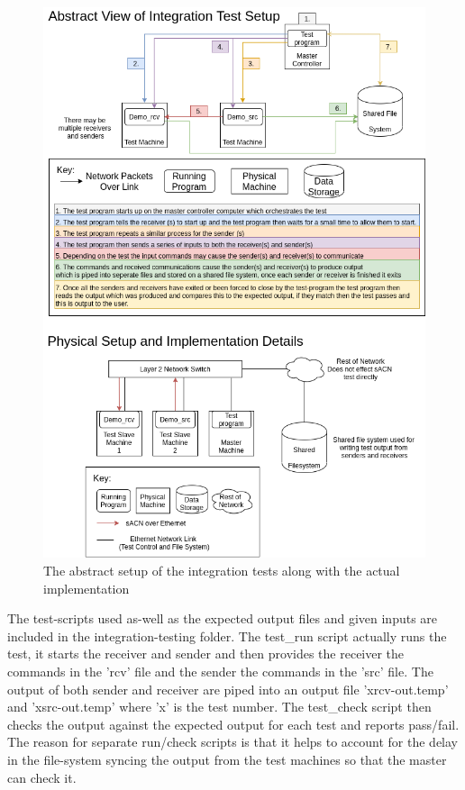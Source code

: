 \documentclass[11pt,a4paper]{article}
\begin{document}
\begin{figure}[H]
	\label{INTEGRATION_TEST_SETUP}
	\includegraphics[width=\textwidth]{SH-Project-Intergration-Tests-Abstract-View.png}
	\caption{The abstract setup of the integration tests along with the actual implementation}
\end{figure}

The test-scripts used as-well as the expected output files and given inputs are included in the integration-testing folder. The test\_run script actually runs the test, it starts the receiver and sender and then provides the receiver the commands in the 'rcv' file and the sender the commands in the 'src' file. The output of both sender and receiver are piped into an output file 'xrcv-out.temp' and 'xsrc-out.temp' where 'x' is the test number. The test\_check script then checks the output against the expected output for each test and reports pass/fail. The reason for separate run/check scripts is that it helps to account for the delay in the file-system syncing the output from the test machines so that the master can check it.
\end{document}
